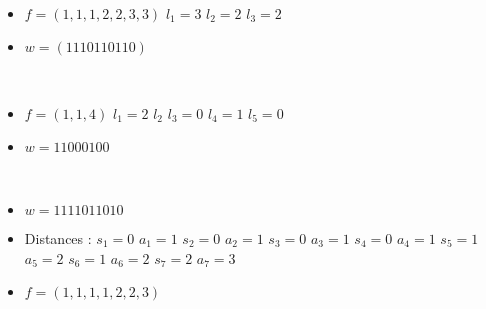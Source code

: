 \begin{example}[$a > b : a = 7, b = 3,
    \mathcal{PF'}_{a,b} \to \mathcal{R}_{a,b}$]
    ~\
    \begin{itemize}
        \item $f = (1, 1, 1, 2, 2, 3, 3)$
            \subitem $l_1 = 3$
            \hspace{2cm} $l_2 = 2$
            \hspace{2cm} $l_3 = 2$
        \item $w = (1110110110)$
    \end{itemize}
    
\end{example}

\begin{example}[$a < b : a = 3, b = 5,
    \mathcal{PF'}_{a,b} \to \mathcal{R}_{a,b}$]
    ~\
    \begin{itemize}
        \item $f = (1, 1, 4)$
            \subitem $l_1 = 2$
            \hspace{2cm} $l_2$
            \hspace{2cm} $l_3 = 0$
            \subitem $l_4 = 1$
            \hspace{2cm} $l_5 = 0$
        \item $w = 11000100$
    \end{itemize}
    
\end{example}

\begin{example}[$a > b : a = 7, b = 3,
    \mathcal{R}_{a,b} \to \mathcal{PF'}_{a,b}$]
    ~\
    \begin{itemize}
        \item $w = 1111011010$
    \end{itemize}
    
    \begin{itemize}
        \item Distances : 
            \subitem $s_1 = 0$
                \hspace{2cm} $a_1 = 1$
            \subitem $s_2 = 0$
                \hspace{2cm} $a_2 = 1$
            \subitem $s_3 = 0$
                \hspace{2cm} $a_3 = 1$
            \subitem $s_4 = 0$
                \hspace{2cm} $a_4 = 1$
            \subitem $s_5 = 1$
                \hspace{2cm} $a_5 = 2$
            \subitem $s_6 = 1$
                \hspace{2cm} $a_6 = 2$
            \subitem $s_7 = 2$
                \hspace{2cm} $a_7 = 3$
        \item $f = (1, 1, 1, 1, 2, 2, 3)$
    \end{itemize}
    
\end{example}

